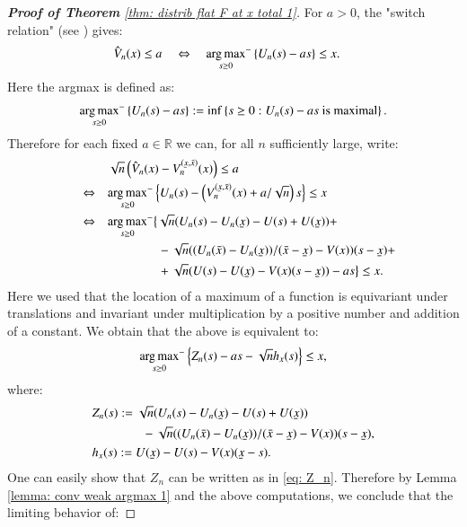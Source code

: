 \begin{proof}[\hypertarget{proof of thm 1 a}{\textbf{Proof of Theorem}} \ref{thm: distrib flat F at x total 1}]\label{proof: thm 1.a}
For $a >0$, the "switch relation" (see \cite{2}) gives:
\begin{align}\label{eq: switch relation 1}
    & \hat{V}_n (x) \leq a \quad \Leftrightarrow \quad {\operatorname*{arg\,max}_{s \geq 0}}^{-} \left\{ U_n(s) - as \right\} \leq x. 
\end{align}
Here the argmax is defined as: 
$${\operatorname*{arg\,max}_{s \geq 0}}^{-} \left\{ U_n(s) - as \right\} := \inf \left\{s \geq 0: U_n(s)-a s \text { is maximal}\right\}.$$
Therefore for each fixed $a \in \mathbb{R}$ we can, for all $n$ sufficiently large, write:
\begin{align*}
    &\sqrt{n} \left( \hat{V}_n (x) -V^{(\ubar{x},\bar{x})}_n (x) \right) \leq a \quad \\
     \quad \Leftrightarrow \quad  &{\argmax_{s \geq 0}}^{-} \left\{ U_n(s) - \left(V^{(\ubar{x},\bar{x})}_n (x)+ a/\sqrt{n} \right) s \right\} \leq x \quad \quad \\
    \quad \Leftrightarrow \quad  &{\argmax_{s \geq 0}}^{-} \big\{ \sqrt{n} (U_n (s) - U_n(\ubar{x}) - U (s) + U(\ubar{x}) ) + \\
    &\quad \quad \quad \quad - \sqrt{n} ((U_n(\bar{x}) - U_n(\ubar{x}))/(\bar{x} - \ubar{x}) - V(x)) (s - \ubar{x}) + \\
    &\quad \quad \quad \quad + \sqrt{n}(U(s) - U(\ubar{x}) - V(x)(s-\ubar{x}) )  -  a s  \big\} \leq x. 
\end{align*}
Here we used that the location of a maximum of a function is equivariant under translations and invariant under multiplication by a positive number and addition of a constant. We obtain that the above is equivalent to:
\begin{align*}
    {\operatorname*{arg\,max}_{s \geq 0}}^{-} \left\{ Z_n(s) - a s - \sqrt{n} h_x(s) \right\} \leq x,
\end{align*}
where:
\begin{align*}
    &Z_n(s) := \sqrt{n} (U_n (s) - U_n(\ubar{x}) - U (s) + U(\ubar{x}) )  \\
    &\quad \quad \quad \quad - \sqrt{n} ((U_n(\bar{x}) - U_n(\ubar{x}))/(\bar{x} - \ubar{x}) - V(x)) (s - \ubar{x}),
    \\ &h_x(s) := U(\ubar{x}) - U(s) - V(x)(\ubar{x}-s).
\end{align*}
One can easily show that $Z_n$ can be written as in \eqref{eq: Z_n}. Therefore by Lemma \ref{lemma: conv weak argmax 1} and the above computations, we conclude that the limiting behavior of: 

\end{proof}
